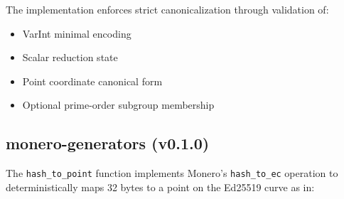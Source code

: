 The implementation enforces strict canonicalization through validation of:
\begin{itemize}
\item VarInt minimal encoding %
\item Scalar reduction state %
\item Point coordinate canonical form %
\item Optional prime-order subgroup membership %
\end{itemize}


\subsection{monero-generators (v0.1.0)}

The \texttt{hash\_to\_point} function implements Monero's \texttt{hash\_to\_ec} operation to deterministically maps 32 bytes to a point on the Ed25519 curve as in:

